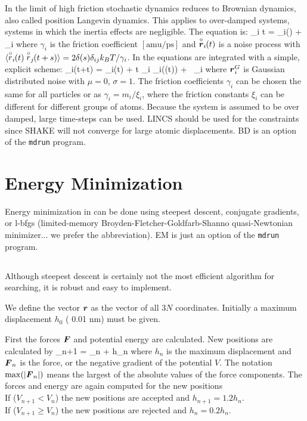 \section{}
\label{sec:BD}
In the limit of high friction stochastic dynamics reduces to 
Brownian dynamics, also called position Langevin dynamics.
This applies to over-damped systems, 
{\ie} systems in which the inertia effects are negligible.
The equation is:
\beq
{\de {}_i \over \de t} =  _i() + \vrond_i
\eeq 
where $\gamma_i$ is the friction coefficient $[\mbox{amu/ps}]$ and
$\stackrel{\circ}{\mbox{\boldmath ${r}$}}_i\!\!(t)$  is a noise process with 
$\langle \stackrel{\circ}{r}_i\!\!(t) \stackrel{\circ}{r}_j\!\!(t+s) \rangle = 
    2 \delta(s) \delta_{ij} k_B T / \gamma_i$.
In {\gromacs} the equations are integrated with a simple, explicit scheme:
\beq
{}_i(t+\Delta t) = _i(t) +
        {\Delta t \over \gamma_i} _i((t)) 
        + \, \ruis_i 
\eeq
where $\mbox{\boldmath ${r}$}^G_i$ is Gaussian distributed noise with $\mu = 0$, $\sigma = 1$.
The friction coefficients $\gamma_i$ can be chosen the same for all
particles or as $\gamma_i = m_i/\xi_i$, where the friction constants
$\xi_i$ can be different for different groups of atoms. 
Because the system is assumed to be over damped, large time-steps
can be used. LINCS should be used for the constraints since SHAKE
will not converge for large atomic displacements.
BD is an option of the \verb'mdrun' program.

\section{Energy Minimization}
\label{sec:EM}
Energy minimization in {\gromacs} can be done using 
steepest descent, conjugate gradients, or l-bfgs (limited-memory Broyden-Fletcher-Goldfarb-Shanno quasi-Newtonian minimizer... we prefer the abbreviation). EM is just an option of the {\tt mdrun} program.

\subsection{}
Although steepest descent is certainly not the most efficient
algorithm for searching, it is robust and easy to implement.

We define the vector $\mbox{\boldmath ${r}$}$ as the vector of all $3N$ coordinates.
Initially a maximum displacement $h_0$ ({\eg} 0.01 nm) must be given. 

First the forces $\mbox{\boldmath ${F}$}$ and potential energy are calculated.
New positions are calculated by
\beq
{}_{n+1} =  _n +  h_n
\eeq
where $h_n$ is the maximum displacement and $\mbox{\boldmath ${F}$}_n$ is the force,
or the negative gradient of the  potential $V$. The notation $\max
(|\mbox{\boldmath ${F}$}_n|)$ means the largest of the absolute values of the force
components.  The forces and energy are again computed for the new positions \\
If ($V_{n+1} < V_n$) the new positions are accepted and $h_{n+1} = 1.2
h_n$. \\
If ($V_{n+1} \geq V_n$) the new positions are rejected and $h_n = 0.2 h_n$.

